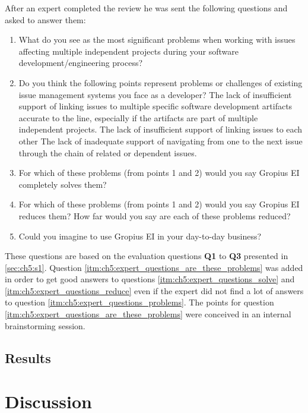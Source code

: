 After an expert completed the review he was sent the following questions and asked to answer them:
\begin{enumerate}
	\item What do you see as the most significant problems when working with issues affecting multiple independent projects during your software development/engineering process? \label{itm:ch5:expert_questions_problems}
	\item Do you think the following points represent problems or challenges of existing issue management systems you face as a developer? \label{itm:ch5:expert_questions_are_these_problems}
	\subitem The lack of insufficient support of linking issues to multiple specific software development artifacts accurate to the line, especially if the artifacts are part of multiple independent projects.
	\subitem The lack of insufficient support of linking issues to each other
	\subitem The lack of inadequate support of navigating from one to the next issue through the chain of related or dependent issues.
	\item For which of these problems (from points 1 and 2) would you say Gropius EI completely solves them? \label{itm:ch5:expert_questions_solve}
	\item For which of these problems (from points 1 and 2) would you say Gropius EI reduces them? \label{itm:ch5:expert_questions_reduce}
	\subitem How far would you say are each of these problems reduced?
	\item Could you imagine to use Gropius EI in your day-to-day business?
\end{enumerate}
These questions are based on the evaluation questions \textbf{Q1} to \textbf{Q3} presented in \cref{sec:ch5:s1}.
Question \ref{itm:ch5:expert_questions_are_these_problems} was added in order to get good answers to questions \ref{itm:ch5:expert_questions_solve} and \ref{itm:ch5:expert_questions_reduce} even if the expert did not find a lot of answers to question \ref{itm:ch5:expert_questions_problems}.
The points for question \ref{itm:ch5:expert_questions_are_these_problems} were conceived in an internal brainstorming session.

\subsection{Results}
\label{ssec:ch5:ss2.2}
\section{Discussion}
\label{sec:ch5:s3}
